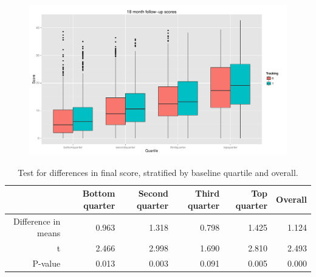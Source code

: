 \documentclass[11pt]{article}
\begin{document}
  \begin{figure}[H]
 \centering
 \includegraphics[scale=0.5]{tracking-stratif.pdf}
 \caption{}
 \label{fig:tracking-stratif}
 \end{figure} 
\begin{table}[ht]
\centering
\begin{tabular}{rrrrrr}
  \hline
 & Bottom quarter & Second quarter & Third quarter & Top quarter & Overall \\ 
  \hline
Difference in means & 0.963 & 1.318 & 0.798 & 1.425 & 1.124 \\ 
  t & 2.466 & 2.998 & 1.690 & 2.810 & 2.493 \\ 
  P-value & 0.013 & 0.003 & 0.091 & 0.005 & 0.000 \\ 
   \hline
\end{tabular}
\caption{Test for differences in final score, stratified by baseline quartile and overall.} 
\end{table} %
\end{document}

